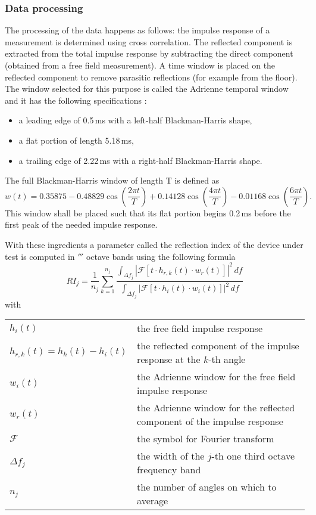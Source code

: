\subsubsection{Data processing}\label{adrwindow}
The processing of the data happens as follows: the impulse response of a measurement is determined using cross correlation. The reflected component is extracted from the total impulse response by subtracting the direct component (obtained from a free field measurement). A time window is placed on the reflected component to remove parasitic reflections (for example from the floor). The window selected for this purpose is called the Adrienne temporal window and it has the following specifications \cite{Adrienne}:
\begin{itemize}
	\setlength{\itemsep}{1pt}
  \setlength{\parskip}{0pt}
  \setlength{\parsep}{0pt}
	\item a leading edge of 0.5\,ms with a left-half Blackman-Harris shape,
	\item a flat portion of length 5.18\,ms,
	\item a trailing edge of 2.22\,ms with a right-half Blackman-Harris shape.
\end{itemize}
The full Blackman-Harris window of length T is defined as 
\[
w(t) = 0.35875 - 0.48829 \cos\left(\frac{2 \pi t}{T}\right) + 0.14128 \cos\left(\frac{4 \pi t}{T}\right) - 0.01168 \cos\left(\frac{6 \pi t}{T}\right).
\]
This window shall be placed such that its flat portion begins 0.2\,ms before the first peak of the needed impulse response.

With these ingredients a parameter called the reflection index of the device under test is computed in $\third$ octave bands using the following formula 
\begin{equation}
RI_j = \frac{1}{n_j} \sum^{n_j}_{k=1} \frac{\int_{\Delta f_j} \left|\mathcal{F}\left[t\cdot h_{r,k}(t)\cdot w_r(t)\right]\right|^2 \,df }{\int_{\Delta f_j} \left|\mathcal{F}\left[t \cdot h_{i}(t) \cdot w_i(t)\right]\right|^2 \,df }
\label{RI}
\end{equation}
with \\

\begin{tabular}{ll}
$h_i(t)$ & the free field impulse response \\
$h_{r,k}(t) = h_k(t) - h_i(t)$ & the reflected component of the impulse response at the $k$-th angle \\
$w_i(t)$ & the Adrienne window for the free field impulse response\\ 
$w_r(t)$ & the Adrienne window for the reflected component of the impulse response\\ 
$\mathcal{F}$ & the symbol for Fourier transform \\
$\Delta f_j$ & the width of the $j$-th one third octave frequency band\\
$n_j$ & the number of angles on which to average\\ 
\end{tabular}


